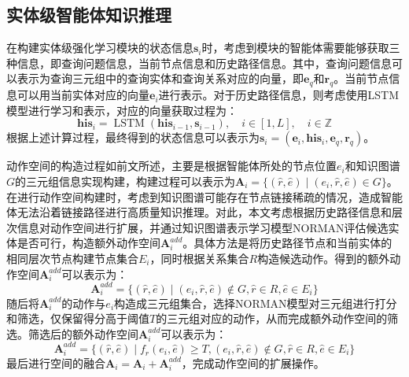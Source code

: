 \documentclass[algorithmlist, AutoFakeBold, AutoFakeSlant, figurelist, tablelist, nomlist, masters]{seuthesix}
\begin{document}
\subsection{实体级智能体知识推理}
在构建实体级强化学习模块的状态信息$\bm{s}_i$时，考虑到模块的智能体需要能够获取三种信息，即查询问题信息，当前节点信息和历史路径信息。其中，查询问题信息可以表示为查询三元组中的查询实体和查询关系对应的向量，即$\bm{e}_q$和$\bm{r}_q$。当前节点信息可以用当前实体对应的向量$\bm{e}_i$进行表示。对于历史路径信息，则考虑使用LSTM模型进行学习和表示，对应的向量获取过程为：
\begin{equation}
  \bm{his}_i=\operatorname{LSTM}\left(\bm{his}_{i - 1}, \bm{s}_{i - 1}\right),\quad i \in [1, L], \quad i \in \mathbb{Z}
  \label{equation_HistoryLSTM}
\end{equation}
根据上述计算过程，最终得到的状态信息可以表示为$\bm{s}_i = (\bm{e}_i, \bm{his}_i, \bm{e}_q, \bm{r}_q)$。

动作空间的构造过程如前文所述，主要是根据智能体所处的节点位置$e_i$和知识图谱$G$的三元组信息实现构建，构建过程可以表示为$\bm{A}_i = \{(\hat{r}, \hat{e}) \mid (e_i, \hat{r}, \hat{e}) \in G\}$。
在进行动作空间构建时，考虑到知识图谱可能存在节点链接稀疏的情况，造成智能体无法沿着链接路径进行高质量知识推理。对此，本文考虑根据历史路径信息和层次信息对动作空间进行扩展，并通过知识图谱表示学习模型NORMAN评估候选实体是否可行，构造额外动作空间$\bm{A}_{i}^{add}$。具体方法是将历史路径节点和当前实体的相同层次节点构建节点集合$E_i$，同时根据关系集合$R$构造候选动作。得到的额外动作空间$\bm{A}_{i}^{add}$可以表示为：
\begin{equation}
  \bm{A}_{i}^{add} = \{(\hat{r}, \hat{e}) \mid (e_i, \hat{r}, \hat{e}) \notin G, \hat{r} \in R, \hat{e} \in E_i \}
\end{equation}
随后将$\bm{A}_{i}^{add}$的动作与$e_i$构造成三元组集合，选择NORMAN模型对三元组进行打分和筛选，仅保留得分高于阈值$T$的三元组对应的动作，从而完成额外动作空间的筛选。筛选后的额外动作空间$\bm{A}_{i}^{add}$可以表示为：
\begin{equation}
  \bm{A}_i^{add} = \{(\hat{r}, \hat{e}) \mid f_{\hat{r}}(e_i, \hat{e}) \geq T, (e_i, \hat{r}, \hat{e}) \notin G, \hat{r} \in R, \hat{e} \in E_i \}
\end{equation}
最后进行空间的融合$\bm{A}_i = \bm{A}_i + \bm{A}_{i}^{add} $，完成动作空间的扩展操作。
\end{document}
